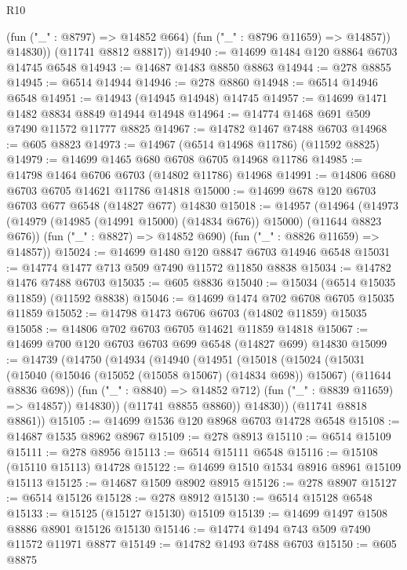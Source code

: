 \begin{lexlean}{R10}
\begin{coremodule}
{{{{{{{{{{{{{{{{{{{{{{{{{{{{{{{{{{{{{{{{{{{{{{{{{{{{{{{{{{{{{{{{{{{{{{{{{{{{{{{{{{{{            (fun ("_" : @8797) => @14852 @664)
            (fun ("_" : @8796 @11659) => @14857))
          @14830))
      (@11741 @8812 @8817))
@14940 := @14699 @1484 @120 @8864 @6703 @14745 @6548
@14943 := @14687 @1483 @8850 @8863
@14944 := @278 @8855
@14945 := @6514 @14944
@14946 := @278 @8860
@14948 := @6514 @14946 @6548
@14951 := @14943 (@14945 @14948) @14745
@14957 := @14699 @1471 @1482 @8834 @8849 @14944 @14948
@14964 := @14774 @1468 @691 @509 @7490 @11572 @11777 @8825
@14967 := @14782 @1467 @7488 @6703
@14968 := @605 @8823
@14973 := @14967 (@6514 @14968 @11786) (@11592 @8825)
@14979 := @14699 @1465 @680 @6708 @6705 @14968 @11786
@14985 := @14798 @1464 @6706 @6703 (@14802 @11786) @14968
@14991 := @14806 @680 @6703 @6705 @14621 @11786 @14818
@15000 := @14699 @678 @120 @6703 @6703 @677 @6548 (@14827 @677) @14830
@15018 := @14957
    (@14964
      (@14973 (@14979 (@14985 (@14991 @15000) (@14834 @676)) @15000) (@11644 @8823 @676))
      (fun ("_" : @8827) => @14852 @690)
      (fun ("_" : @8826 @11659) => @14857))
@15024 := @14699 @1480 @120 @8847 @6703 @14946 @6548
@15031 := @14774 @1477 @713 @509 @7490 @11572 @11850 @8838
@15034 := @14782 @1476 @7488 @6703
@15035 := @605 @8836
@15040 := @15034 (@6514 @15035 @11859) (@11592 @8838)
@15046 := @14699 @1474 @702 @6708 @6705 @15035 @11859
@15052 := @14798 @1473 @6706 @6703 (@14802 @11859) @15035
@15058 := @14806 @702 @6703 @6705 @14621 @11859 @14818
@15067 := @14699 @700 @120 @6703 @6703 @699 @6548 (@14827 @699) @14830
@15099 := @14739
    (@14750
      (@14934
        (@14940
          (@14951
            (@15018
              (@15024
                (@15031
                  (@15040
                    (@15046 (@15052 (@15058 @15067) (@14834 @698)) @15067)
                    (@11644 @8836 @698))
                  (fun ("_" : @8840) => @14852 @712)
                  (fun ("_" : @8839 @11659) => @14857))
                @14830))
            (@11741 @8855 @8860))
          @14830))
      (@11741 @8818 @8861))
@15105 := @14699 @1536 @120 @8968 @6703 @14728 @6548
@15108 := @14687 @1535 @8962 @8967
@15109 := @278 @8913
@15110 := @6514 @15109
@15111 := @278 @8956
@15113 := @6514 @15111 @6548
@15116 := @15108 (@15110 @15113) @14728
@15122 := @14699 @1510 @1534 @8916 @8961 @15109 @15113
@15125 := @14687 @1509 @8902 @8915
@15126 := @278 @8907
@15127 := @6514 @15126
@15128 := @278 @8912
@15130 := @6514 @15128 @6548
@15133 := @15125 (@15127 @15130) @15109
@15139 := @14699 @1497 @1508 @8886 @8901 @15126 @15130
@15146 := @14774 @1494 @743 @509 @7490 @11572 @11971 @8877
@15149 := @14782 @1493 @7488 @6703
@15150 := @605 @8875
}}}}}}}}}}}}}}}}}}}}}}}}}}}}}}}}}}}}}}}}}}}}}}}}}}}}}}}}}}}}}}}}}}}}}}}}}}}}}}}}}}}}
\end{coremodule}
\end{lexlean}
